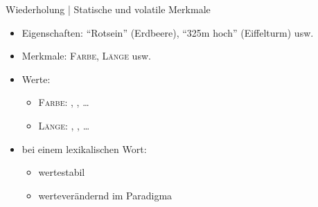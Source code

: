 \begin{frame}
  {Wiederholung | Statische und volatile Merkmale}
  \onslide<+->
  \begin{itemize}[<+->]
    \item Eigenschaften: "`Rotsein"' (Erdbeere), "`325m hoch"' (Eiffelturm) usw.
    \item Merkmale: \alert{\textsc{Farbe}}, \alert{\textsc{Länge}} usw.
    \item Werte:
      \begin{itemize}[<+->]
        \item \alert{\textsc{Farbe}}: , , \ldots
        \item \alert{\textsc{Länge}}: \rot{\textit{3cm}}, , \ldots
      \end{itemize}
  \end{itemize}
  \onslide<+->
  \Halbzeile 
  \begin{exe}
    \ex
    \begin{xlist}
      \onslide<+->
      \onslide<+->
    \end{xlist}
  \end{exe}
  \Halbzeile
  \begin{itemize}[<+->]
    \item bei einem lexikalischen Wort:
      \begin{itemize}
        \item {} wertestabil
        \item {} werteverändernd im Paradigma
      \end{itemize}
  \end{itemize}
\end{frame}

